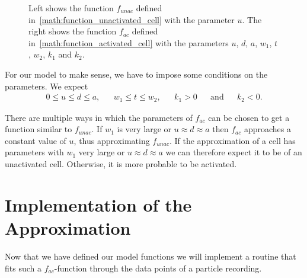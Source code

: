 \begin{figure}[h]
\begin{subfigure}{0.45\linewidth}
	\end{subfigure}
	
	\caption{Left shows the function $f_{unac}$ defined in~\ref{math:function_unactivated_cell} with the parameter $u$. The right shows the function $f_{ac}$ defined in~\ref{math:function_activated_cell} with the parameters $u$, $d$, $a$, $w_1$, $t$, $w_2$, $k_1$ and $k_2$.}
	\label{fig:typical_time_series_with_parameters}
\end{figure}

For our model to make sense, we have to impose some conditions on the parameters. We expect
\begin{align*}
	0 \leq u \leq d \leq a, && w_1 \leq t \leq w_2, && k_1 > 0 && \text{and} && k_2 < 0.
\end{align*}

There are multiple ways in which the parameters of $f_{ac}$ can be chosen to get a function similar to $f_{unac}$. If $w_1$ is very large or $u \approx d \approx a$ then $f_{ac}$ approaches a constant value of $u$, thus approximating $f_{unac}$. If the approximation of a cell has parameters with $w_1$ very large or $u \approx d \approx a$ we can therefore expect it to be of an unactivated cell. Otherwise, it is more probable to be activated.

\section{Implementation of the Approximation}

Now that we have defined our model functions we will implement a routine that fits such a $f_{ac}$-function through the data points of a particle recording.

